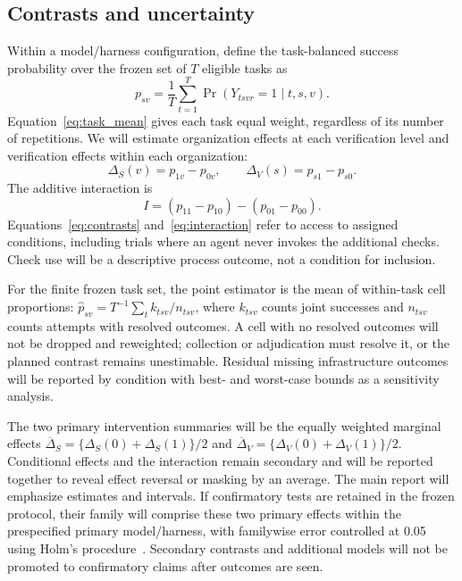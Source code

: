 \documentclass[11pt,a4paper]{article}
\begin{document}
\subsection{Contrasts and uncertainty}
Within a model/harness configuration, define the task-balanced success probability over the frozen set of $T$ eligible tasks as
\begin{equation}\label{eq:task_mean}
p_{sv}=\frac{1}{T}\sum_{t=1}^{T}\Pr(Y_{tsvr}=1\mid t,s,v).
\end{equation}
Equation~\eqref{eq:task_mean} gives each task equal weight, regardless of its number of repetitions. We will estimate organization effects at each verification level and verification effects within each organization:
\begin{equation}\label{eq:contrasts}
\Delta_S(v)=p_{1v}-p_{0v},\qquad
\Delta_V(s)=p_{s1}-p_{s0}.
\end{equation}
The additive interaction is
\begin{equation}\label{eq:interaction}
I=(p_{11}-p_{10})-(p_{01}-p_{00}).
\end{equation}
Equations~\eqref{eq:contrasts} and~\eqref{eq:interaction} refer to access to assigned conditions, including trials where an agent never invokes the additional checks. Check use will be a descriptive process outcome, not a condition for inclusion.

For the finite frozen task set, the point estimator is the mean of within-task cell proportions: $\widehat p_{sv}=T^{-1}\sum_t k_{tsv}/n_{tsv}$, where $k_{tsv}$ counts joint successes and $n_{tsv}$ counts attempts with resolved outcomes. A cell with no resolved outcomes will not be dropped and reweighted; collection or adjudication must resolve it, or the planned contrast remains unestimable. Residual missing infrastructure outcomes will be reported by condition with best- and worst-case bounds as a sensitivity analysis.

The two primary intervention summaries will be the equally weighted marginal effects $\overline\Delta_S=\{\Delta_S(0)+\Delta_S(1)\}/2$ and $\overline\Delta_V=\{\Delta_V(0)+\Delta_V(1)\}/2$. Conditional effects and the interaction remain secondary and will be reported together to reveal effect reversal or masking by an average. The main report will emphasize estimates and intervals. If confirmatory tests are retained in the frozen protocol, their family will comprise these two primary effects within the prespecified primary model/harness, with familywise error controlled at 0.05 using Holm's procedure~\cite{holm1979multiple}. Secondary contrasts and additional models will not be promoted to confirmatory claims after outcomes are seen.
\end{document}
